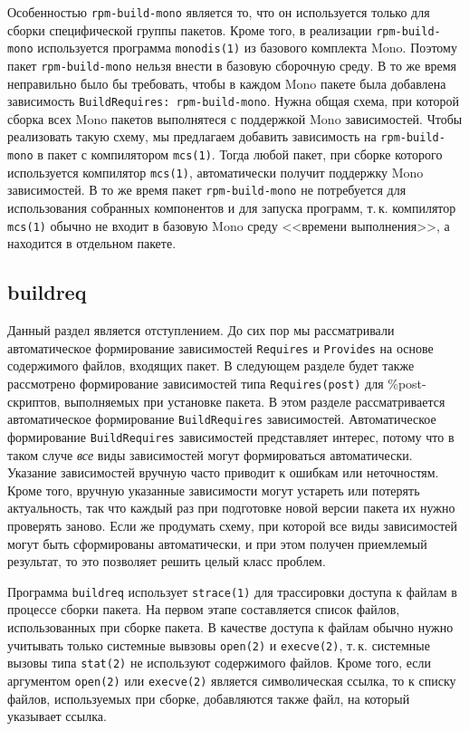 \documentclass[russian,a4paper,12pt,titlepage]{article}
\begin{document}
Особенностью \verb|rpm-build-mono| является то, что он используется только для сборки специфической группы
пакетов.  Кроме того, в реализации \verb|rpm-build-mono| используется программа \verb|monodis(1)| из базового
комплекта Mono.  Поэтому пакет \verb|rpm-build-mono| нельзя внести в базовую сборочную среду.  В то же время
неправильно было бы требовать, чтобы в каждом Mono пакете была добавлена зависимость \texttt{BuildRequires: rpm-build-mono}.
Нужна общая схема, при которой сборка всех Mono пакетов выполнятеся с поддержкой Mono зависимостей.
Чтобы реализовать такую схему, мы предлагаем добавить зависимость на \verb|rpm-build-mono| в пакет
с компилятором \verb|mcs(1)|.  Тогда любой пакет, при сборке которого используется компилятор \verb|mcs(1)|,
автоматически получит поддержку Mono зависимостей.  В то же время пакет \verb|rpm-build-mono| не потребуется
для использования собранных компонентов и для запуска программ, т.\,к. компилятор \verb|mcs(1)| обычно
не входит в базовую Mono среду <<времени выполнения>>, а находится в отдельном пакете.

\subsection{buildreq}
Данный раздел является отступлением.  До сих пор мы рассматривали автоматическое формирование
зависимостей \verb|Requires| и \verb|Provides| на основе содержимого файлов, входящих пакет.
В следующем разделе будет также рассмотрено формирование зависимостей типа \verb|Requires(post)|
для \%post-скриптов, выполняемых при установке пакета.  В этом разделе рассматривается автоматическое
формирование \verb|BuildRequires| зависимостей.  Автоматическое формирование \verb|BuildRequires|
зависимостей представляет интерес, потому что в таком случе \emph{все} виды зависимостей могут
формироваться автоматически.  Указание зависимостей вручную часто приводит к ошибкам или неточностям.
Кроме того, вручную указанные зависимости могут устареть или потерять актуальность, так что каждый
раз при подготовке новой версии пакета их нужно проверять заново.  Если же продумать схему, при которой
все виды зависимостей могут быть сформированы автоматически, и при этом получен приемлемый результат,
то это позволяет решить целый класс проблем.

Программа \verb|buildreq| использует \verb|strace(1)| для трассировки доступа к файлам в процессе сборки пакета.
На первом этапе составляется список файлов, использованных при сборке пакета.
В качестве доступа к файлам обычно нужно учитывать только системные вывзовы \verb|open(2)| и \verb|execve(2)|,
т.\,к. системные вызовы типа \verb|stat(2)| не используют содержимого файлов.  Кроме того, если аргументом
\verb|open(2)| или \verb|execve(2)| является символическая ссылка, то к списку файлов, используемых при сборке,
добавляются также файл, на который указывает ссылка.
\end{document}
